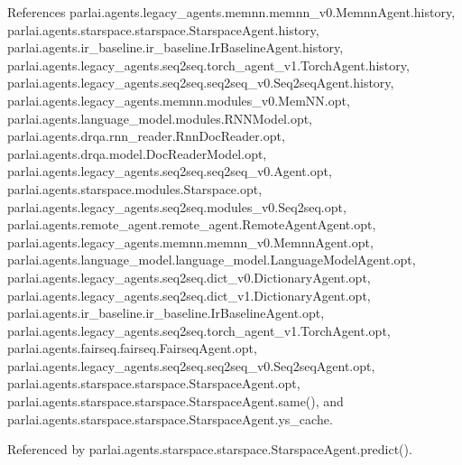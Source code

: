 References parlai.\+agents.\+legacy\+\_\+agents.\+memnn.\+memnn\+\_\+v0.\+Memnn\+Agent.\+history, parlai.\+agents.\+starspace.\+starspace.\+Starspace\+Agent.\+history, parlai.\+agents.\+ir\+\_\+baseline.\+ir\+\_\+baseline.\+Ir\+Baseline\+Agent.\+history, parlai.\+agents.\+legacy\+\_\+agents.\+seq2seq.\+torch\+\_\+agent\+\_\+v1.\+Torch\+Agent.\+history, parlai.\+agents.\+legacy\+\_\+agents.\+seq2seq.\+seq2seq\+\_\+v0.\+Seq2seq\+Agent.\+history, parlai.\+agents.\+legacy\+\_\+agents.\+memnn.\+modules\+\_\+v0.\+Mem\+N\+N.\+opt, parlai.\+agents.\+language\+\_\+model.\+modules.\+R\+N\+N\+Model.\+opt, parlai.\+agents.\+drqa.\+rnn\+\_\+reader.\+Rnn\+Doc\+Reader.\+opt, parlai.\+agents.\+drqa.\+model.\+Doc\+Reader\+Model.\+opt, parlai.\+agents.\+legacy\+\_\+agents.\+seq2seq.\+seq2seq\+\_\+v0.\+Agent.\+opt, parlai.\+agents.\+starspace.\+modules.\+Starspace.\+opt, parlai.\+agents.\+legacy\+\_\+agents.\+seq2seq.\+modules\+\_\+v0.\+Seq2seq.\+opt, parlai.\+agents.\+remote\+\_\+agent.\+remote\+\_\+agent.\+Remote\+Agent\+Agent.\+opt, parlai.\+agents.\+legacy\+\_\+agents.\+memnn.\+memnn\+\_\+v0.\+Memnn\+Agent.\+opt, parlai.\+agents.\+language\+\_\+model.\+language\+\_\+model.\+Language\+Model\+Agent.\+opt, parlai.\+agents.\+legacy\+\_\+agents.\+seq2seq.\+dict\+\_\+v0.\+Dictionary\+Agent.\+opt, parlai.\+agents.\+legacy\+\_\+agents.\+seq2seq.\+dict\+\_\+v1.\+Dictionary\+Agent.\+opt, parlai.\+agents.\+ir\+\_\+baseline.\+ir\+\_\+baseline.\+Ir\+Baseline\+Agent.\+opt, parlai.\+agents.\+legacy\+\_\+agents.\+seq2seq.\+torch\+\_\+agent\+\_\+v1.\+Torch\+Agent.\+opt, parlai.\+agents.\+fairseq.\+fairseq.\+Fairseq\+Agent.\+opt, parlai.\+agents.\+legacy\+\_\+agents.\+seq2seq.\+seq2seq\+\_\+v0.\+Seq2seq\+Agent.\+opt, parlai.\+agents.\+starspace.\+starspace.\+Starspace\+Agent.\+opt, parlai.\+agents.\+starspace.\+starspace.\+Starspace\+Agent.\+same(), and parlai.\+agents.\+starspace.\+starspace.\+Starspace\+Agent.\+ys\+\_\+cache.



Referenced by parlai.\+agents.\+starspace.\+starspace.\+Starspace\+Agent.\+predict().

